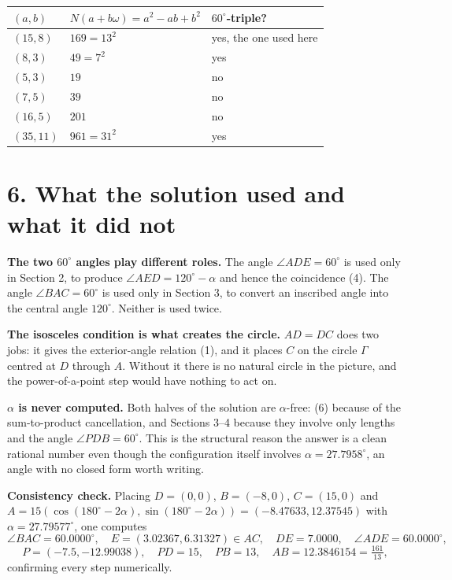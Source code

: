 \documentclass[12pt]{article}
\newcommand{\ang}{^\circ}
\newcommand{\Gam}{\Gamma}
\begin{document}
\begin{center}
\small
\renewcommand{\arraystretch}{1.35}
\begin{tabularx}{0.92\textwidth}{@{}lXX@{}}
\toprule
\((a,b)\) & \(N(a+b\omega)=a^2-ab+b^2\) & \(60\ang\)-triple? \\
\midrule
\((15,8)\)  & \(169=13^2\)  & yes, the one used here \\
\((8,3)\)   & \(49=7^2\)    & yes \\
\((5,3)\)   & \(19\)        & no \\
\((7,5)\)   & \(39\)        & no \\
\((16,5)\)  & \(201\)       & no \\
\((35,11)\) & \(961=31^2\)  & yes \\
\bottomrule
\end{tabularx}
\end{center}

\section*{6. What the solution used and what it did not}

\textbf{The two \(60\ang\) angles play different roles.} The angle
\(\angle ADE=60\ang\) is used only in Section 2, to produce
\(\angle AED=120\ang-\alpha\) and hence the coincidence (4). The angle
\(\angle BAC=60\ang\) is used only in Section 3, to convert an inscribed
angle into the central angle \(120\ang\). Neither is used twice.

\textbf{The isosceles condition is what creates the circle.} \(AD=DC\)
does two jobs: it gives the exterior-angle relation (1), and it places
\(C\) on the circle \(\Gam\) centred at \(D\) through \(A\). Without it
there is no natural circle in the picture, and the power-of-a-point step
would have nothing to act on.

\textbf{\(\alpha\) is never computed.} Both halves of the solution are
\(\alpha\)-free: (6) because of the sum-to-product cancellation, and
Sections 3--4 because they involve only lengths and the angle
\(\angle PDB=60\ang\). This is the structural reason the answer is a
clean rational number even though the configuration itself involves
\(\alpha=27.7958\ang\), an angle with no closed form worth writing.

\textbf{Consistency check.} Placing \(D=(0,0)\), \(B=(-8,0)\),
\(C=(15,0)\) and \(A=15(\cos(180\ang-2\alpha),\sin(180\ang-2\alpha))
=(-8.47633,12.37545)\) with \(\alpha=27.79577\ang\), one computes
\[
\angle BAC=60.0000\ang,\quad
E=(3.02367,6.31327)\in AC,\quad
DE=7.0000,\quad \angle ADE=60.0000\ang,
\]
\[
P=(-7.5,-12.99038),\quad PD=15,\quad PB=13,\quad
AB=12.3846154=\tfrac{161}{13},
\]
confirming every step numerically.
\end{document}
